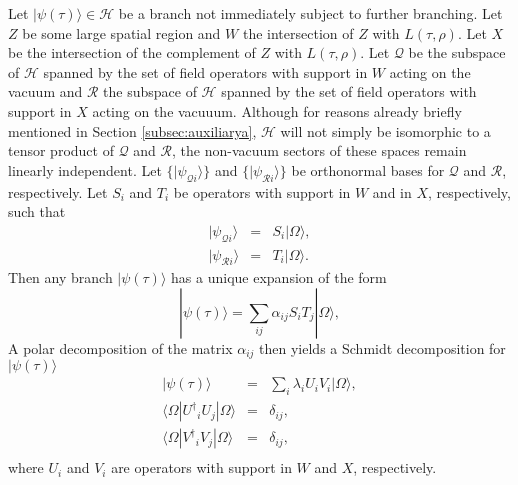 \documentclass[12pt,amsmath,amssymb,onecolumn]{revtex4-2}
\begin{document}
Let $|\psi( \tau) \rangle  \in \mathcal{H}$ be a branch
not immediately
subject to further branching.
Let $Z$ be some large spatial region and
$W$ the intersection of $Z$ with $L( \tau, \rho)$.
Let $X$ be the intersection of the complement
of $Z$ with $L( \tau, \rho)$.
Let $\mathcal{Q}$ be the subspace of $\mathcal{H}$ spanned
by the set of field operators with support in $W$ acting
on the vacuum
and $\mathcal{R}$ the subspace of $\mathcal{H}$ spanned
by the set of field operators with support in $X$
acting on the vacuuum.
Although for reasons 
already briefly mentioned in Section \ref{subsec:auxiliarya},
$\mathcal{H}$ will not simply be isomorphic to a tensor product of
$\mathcal{Q}$ and $\mathcal{R}$, the non-vacuum sectors of
these spaces
remain linearly independent.
Let
$\{ |\psi_{\mathcal{Q}i} \rangle  \}$ and $\{| \psi_{\mathcal{R}i} \rangle  \}$
be orthonormal bases for $\mathcal{Q}$ and $\mathcal{R}$,
respectively.
Let $S_i$ and $T_i$ be
operators with support in $W$ and in $X$, respectively,
such that
\begin{subequations}
\begin{eqnarray}
  \label{defhatq}
  |\psi_{\mathcal{Q}i} \rangle  & = & S_i |\Omega \rangle , \\
  \label{defhatr}
  |\psi_{\mathcal{R}i} \rangle  & = & T_i |\Omega \rangle .
\end{eqnarray}
\end{subequations}
Then any branch $|\psi( \tau) \rangle $ has
a unique expansion of the form
\begin{equation}
  \label{generalexpansion0}
  |\psi( \tau) \rangle  = \sum_{ij} \alpha_{ij} S_i T_j |\Omega \rangle ,
\end{equation}
A polar decomposition of the matrix $\alpha_{ij}$ then
yields a Schmidt decomposition for $|\psi(\tau) \rangle $
\begin{subequations}
\begin{eqnarray}
  \label{tensorprod}
  |\psi( \tau) \rangle  & = & \sum_i \lambda_i U_i V_i |\Omega \rangle , \\
  \label{orthonormalq}
   \langle    \Omega | {U^\dagger}_i U_j| \Omega \rangle  & = & \delta_{ij}, \\
  \label{orthonormalr}
   \langle   \Omega | {V^\dagger}_i V_j| \Omega \rangle  & = & \delta_{ij}, \\
\end{eqnarray}
\end{subequations}
where $U_i$ and $V_i$ are operators with
support in $W$ and $X$, respectively.
\end{document}
